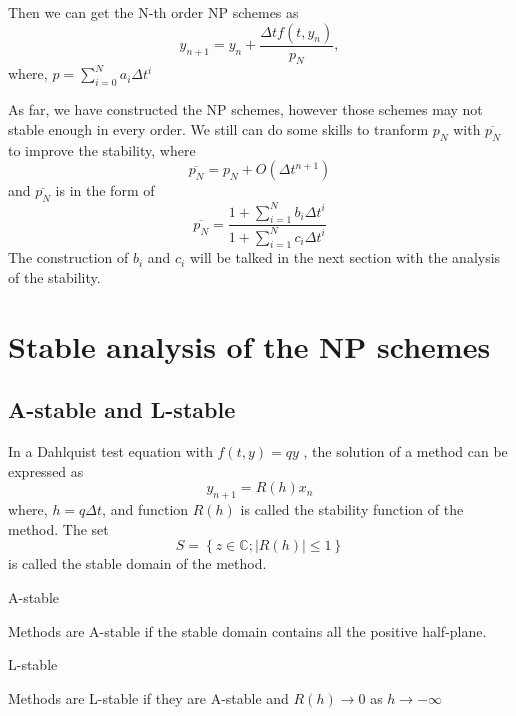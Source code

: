 \documentclass[review]{elsarticle}
\theoremstyle{plain}\newtheorem{definition}{\sc{Definition}}
\theoremstyle{defination}\newtheorem{example}{Example}[section]
\numberwithin{equation}{section}
\numberwithin{table}{section}
\begin{document}
{Then we can get the N-th order NP schemes as 
\begin{equation}
  y_{n+1}=y_n+\frac{\Delta tf(t,y_n)}{p_N},
  \end{equation}
  where, $p=\sum_{i=0}^N a_i \Delta t^i$


  As far, we have constructed the NP schemes, however those schemes may not stable enough in every order. We still can do some skills to tranform $p_N$ with $\overline{p_N}$ to improve the stability, where
\begin{equation}
  \overline{p_N}= p_N+O(\Delta t^{n+1})
  \end{equation}
  and $\overline{p_N}$ is in the form of 
\begin{equation}
  \overline{p_N}= \frac{1+\sum_{i=1}^N b_i \Delta t^i}{1+\sum_{i=1}^N c_i\Delta t^i} 
  \end{equation}
  The construction of $b_i$ and $c_i$ will be talked in  the next section with the analysis of the stability. 
  \section{Stable analysis of the NP schemes}  

  \subsection{A-stable and L-stable}
 In a Dahlquist test equation with $f(t,y)=qy$ , the solution of a method can be expressed as
 \begin{equation}
   y_{n+1} = R(h)x_n
   \end{equation}
   where, $h=q\Delta t$, and function $R(h)$ is called the stability function of the method. The set 
   \begin{equation}
	 S = \left\{ z\in \mathbb{C}; |R(h)| \le 1\right\}
	 \end{equation}
	 is called the stable domain of the method.

	  \hspace{0.2cm}  \hspace{0.3cm} A-stable 

	 Methods are A-stable if the stable domain contains all the positive half-plane. 


	  \hspace{0.2cm}  \hspace{0.3cm} L-stable 

	  Methods are L-stable if they are A-stable and $R(h)\rightarrow 0$ as $h\rightarrow -\infty$

}
\end{document}
